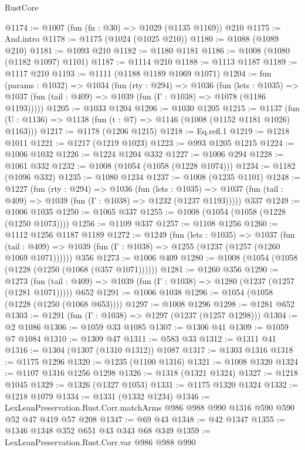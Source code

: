 \begin{lexlean}{RustCore}
\begin{coremodule}
@1174 := @1007 (fun (fn : @30) => @1029 (@1135 @1169)) @210
@1175 := And.intro
@1178 := @1175 (@1024 (@1025 @210))
@1180 := @1088 (@1089 @210)
@1181 := @1093 @210
@1182 := @1180 @1181
@1186 := @1008 (@1080 (@1182 @1097) @1101)
@1187 := @1114 @210
@1188 := @1113 @1187
@1189 := @1117 @210
@1193 := @1111 (@1188 @1189 @1069 @1071)
@1204 := fun (params : @1032) =>
  @1034
    (fun (rty : @294) =>
    @1036
      (fun (lets : @1035) =>
      @1037 (fun (tail : @409) => @1039 (fun (Γ : @1038) => @1078 (@1186 @1193)))))
@1205 := @1033 @1204
@1206 := @1030 @1205
@1215 := @1137 (fun (U : @1136) => @1138 (fun (t : @7) => @1146 (@1008 (@1152 @1181 @1026) @1163)))
@1217 := @1178 (@1206 @1215)
@1218 := Eq.refl.{1}
@1219 := @1218 @1011
@1221 := @1217 (@1219 @1023)
@1223 := @993 @1205 @1215
@1224 := @1006 @1032
@1226 := @1224 @1204 @332
@1227 := @1006 @294
@1228 := @1061 @332
@1232 := @1008 (@1054 (@1058 (@1228 @1074)))
@1234 := @1182 (@1096 @332)
@1235 := @1080 @1234
@1237 := @1008 (@1235 @1101)
@1248 := @1227
    (fun (rty : @294) =>
    @1036
      (fun (lets : @1035) =>
      @1037 (fun (tail : @409) => @1039 (fun (Γ : @1038) => @1232 (@1237 @1193)))))
    @337
@1249 := @1006 @1035
@1250 := @1065 @337
@1255 := @1008 (@1054 (@1058 (@1228 (@1250 @1073))))
@1256 := @1109 @337
@1257 := @1108 @1256
@1260 := @1112 @1256 @1187 @1189
@1272 := @1249
    (fun (lets : @1035) =>
    @1037
      (fun (tail : @409) => @1039 (fun (Γ : @1038) => @1255 (@1237 (@1257 (@1260 @1069 @1071))))))
    @356
@1273 := @1006 @409
@1280 := @1008 (@1054 (@1058 (@1228 (@1250 (@1068 (@357 @1071))))))
@1281 := @1260 @356
@1290 := @1273
    (fun (tail : @409) => @1039 (fun (Γ : @1038) => @1280 (@1237 (@1257 (@1281 @1071)))))
    @652
@1291 := @1006 @1038
@1296 := @1054 (@1058 (@1228 (@1250 (@1068 @653))))
@1297 := @1008 @1296
@1298 := @1281 @652
@1303 := @1291 (fun (Γ : @1038) => @1297 (@1237 (@1257 @1298)))
@1304 := @2 @1086
@1306 := @1059 @33 @1085
@1307 := @1306 @41
@1309 := @1059 @7 @1084
@1310 := @1309 @47
@1311 := @583 @33
@1312 := @1311 @41
@1316 := @1304 (@1307 (@1310 @1312)) @1087
@1317 := @1303 @1316
@1318 := @1175 @1296
@1320 := @1235 (@1100 @1316)
@1321 := @1008 @1320
@1324 := @1107 @1316 @1256 @1298
@1326 := @1318 (@1321 @1324)
@1327 := @1218 @1045
@1329 := @1326 (@1327 @1053)
@1331 := @1175 @1320 @1324
@1332 := @1218 @1079
@1334 := @1331 (@1332 @1234)
@1346 := LexLeanPreservation.Rust.Corr.matchArms
    @986
    @988
    @990
    @1316
    @590
    @590
    @52
    @47
    @419
    @57
    @208
@1347 := @69 @43
@1348 := @42 @1347
@1355 := @1346 @1348 @352 @651 @43 @343 @68 @349
@1359 := LexLeanPreservation.Rust.Corr.var @986 @988 @990

\end{coremodule}
\end{lexlean}
